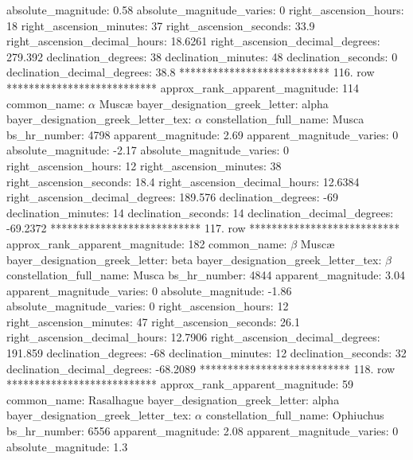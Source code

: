                 absolute_magnitude: 0.58
         absolute_magnitude_varies: 0
             right_ascension_hours: 18
           right_ascension_minutes: 37
           right_ascension_seconds: 33.9
     right_ascension_decimal_hours: 18.6261
   right_ascension_decimal_degrees: 279.392
               declination_degrees: 38
               declination_minutes: 48
               declination_seconds: 0
       declination_decimal_degrees: 38.8
*************************** 116. row ***************************
    approx_rank_apparent_magnitude: 114
                       common_name: $\alpha$ Musc{\ae}
    bayer_designation_greek_letter: alpha
bayer_designation_greek_letter_tex: $\alpha$
           constellation_full_name: Musca
                      bs_hr_number: 4798
                apparent_magnitude: 2.69
         apparent_magnitude_varies: 0
                absolute_magnitude: -2.17
         absolute_magnitude_varies: 0
             right_ascension_hours: 12
           right_ascension_minutes: 38
           right_ascension_seconds: 18.4
     right_ascension_decimal_hours: 12.6384
   right_ascension_decimal_degrees: 189.576
               declination_degrees: -69
               declination_minutes: 14
               declination_seconds: 14
       declination_decimal_degrees: -69.2372
*************************** 117. row ***************************
    approx_rank_apparent_magnitude: 182
                       common_name: $\beta$ Musc{\ae}
    bayer_designation_greek_letter: beta
bayer_designation_greek_letter_tex: $\beta$
           constellation_full_name: Musca
                      bs_hr_number: 4844
                apparent_magnitude: 3.04
         apparent_magnitude_varies: 0
                absolute_magnitude: -1.86
         absolute_magnitude_varies: 0
             right_ascension_hours: 12
           right_ascension_minutes: 47
           right_ascension_seconds: 26.1
     right_ascension_decimal_hours: 12.7906
   right_ascension_decimal_degrees: 191.859
               declination_degrees: -68
               declination_minutes: 12
               declination_seconds: 32
       declination_decimal_degrees: -68.2089
*************************** 118. row ***************************
    approx_rank_apparent_magnitude: 59
                       common_name: Rasalhague
    bayer_designation_greek_letter: alpha
bayer_designation_greek_letter_tex: $\alpha$
           constellation_full_name: Ophiuchus
                      bs_hr_number: 6556
                apparent_magnitude: 2.08
         apparent_magnitude_varies: 0
                absolute_magnitude: 1.3
